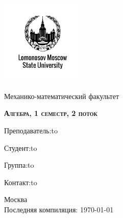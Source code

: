 \documentclass[a4paper, 12pt]{article}
\theoremstyle{definition}
\begin{document}
  \begin{titlepage}
    \newpage
    \begin{center}
    \includegraphics[width=4cm]{image/image.png}
    \end{center}
    \vspace{4em}
    
    \begin{center}
    \Large Механико-математический факультет  
    \end{center}
    \vspace{2em}
    
    \begin{center}
    \large{\textsc{\textbf{Алгебра, 1 семестр, 2 поток}}}
    \end{center}
    \vspace{6em}
    
    \newbox{\lbox}
    \newlength{\maxl}
    \setlength{\maxl}{\wd\lbox}
    \hfill\parbox{11cm}
    {
    Преподаватель:\hfill\hbox to\vspace{0.5cm}
    
    Студент:\hfill\hbox to\vspace{0.5cm}

    Группа:\hfill\hbox to\vspace{0.5cm}
    
    Контакт:\hfill\hbox to\vspace{0.5cm}
    }

    \vspace{\fill}
    \begin{center}
    Москва \\Последняя компиляция: \today
    \end{center}
    
  \end{titlepage}
  \tableofcontents
  \fontsize{14pt}{20pt}\selectfont
  \newpage
  \fontsize{14pt}{20pt}\selectfont
\end{document}
